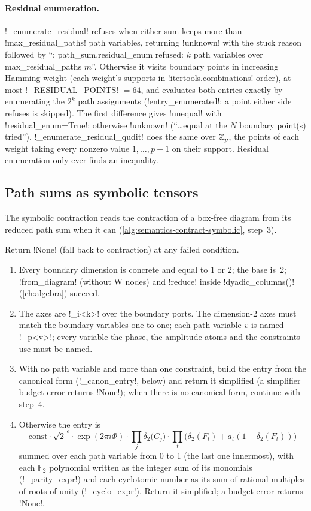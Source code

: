 \paragraph{Residual enumeration.} \py!_enumerate_residual! refuses when either sum keeps more than \py!max_residual_paths! path variables, returning \code!unknown! with the stuck reason followed by ``; path\_sum.residual\_enum refused: $k$ path variables over max\_residual\_paths $m$''. Otherwise it visits boundary points in increasing Hamming weight (each weight's supports in \py!itertools.combinations! order), at most \py!_RESIDUAL_POINTS! $=64$, and evaluates both entries exactly by enumerating the $2^k$ path assignments (\py!entry_enumerated!; a point either side refuses is skipped). The first difference gives \code!unequal! with \py!residual_enum=True!; otherwise \code!unknown! (``\ldots equal at the $N$ boundary point(s) tried''). \py!_enumerate_residual_qudit! does the same over $\mathbb{Z}_p$, the points of each weight taking every nonzero value $1,\dots,p-1$ on their support. Residual enumeration only ever finds an inequality.

\subsection{Path sums as symbolic tensors}\label{sec:semantics-pathsum-tensor}

The symbolic contraction reads the contraction of a box-free diagram from its reduced path sum when it can (\cref{alg:semantics-contract-symbolic}, step~3).

\begin{algorithm}\label{alg:semantics-pathsum-tensor}
Return \py!None! (fall back to contraction) at any failed condition.
\begin{enumerate}
\item Every boundary dimension is concrete and equal to 1 or 2; the base is~2; \py!from_diagram! (without W nodes) and \py!reduce! inside \py!dyadic_columns()! (\cref{ch:algebra}) succeed.
\item The axes are \code!_i<k>! over the boundary ports. The dimension-2 axes must match the boundary variables one to one; each path variable $v$ is named \code!_p<v>!; every variable the phase, the amplitude atoms and the constraints use must be named.
\item With no path variable and more than one constraint, build the entry from the canonical form (\py!_canon_entry!, below) and return it simplified (a simplifier budget error returns \py!None!); when there is no canonical form, continue with step~4.
\item Otherwise the entry is
\[
\mathrm{const}\cdot\sqrt2^{\,e}\cdot\exp(2\pi i\Phi)\cdot\prod_j\delta_2\bigl(C_j\bigr)\cdot\prod_t\bigl(\delta_2(F_t)+a_t(1-\delta_2(F_t))\bigr)
\]
summed over each path variable from 0 to 1 (the last one innermost), with each $\mathbb F_2$ polynomial written as the integer sum of its monomials (\py!_parity_expr!) and each cyclotomic number as its sum of rational multiples of roots of unity (\py!_cyclo_expr!). Return it simplified; a budget error returns \py!None!.
\end{enumerate}
\end{algorithm}

